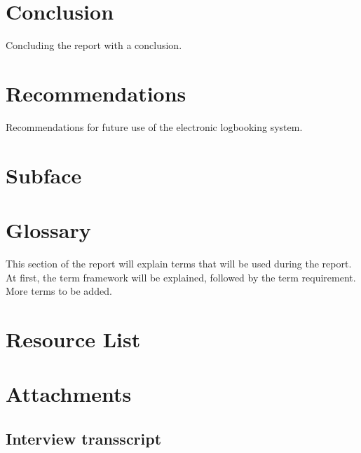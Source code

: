 \documentclass[paper=a4, fontsize=11pt,twoside]{scrartcl}	%
\begin{document}
\newpage
\section{Conclusion}
Concluding the report with a conclusion.
\newpage
\section{Recommendations}
Recommendations for future use of the electronic logbooking system.
\newpage

\section{Subface}
\newpage

\section{Glossary}
This section of the report will explain terms that will be used during the report. At first, the term framework will be explained, followed by the term requirement. More terms to be added.
\newpage

\section{Resource List}


\newpage

\section{Attachments}

\subsection{Interview transscript}




\end{document}

